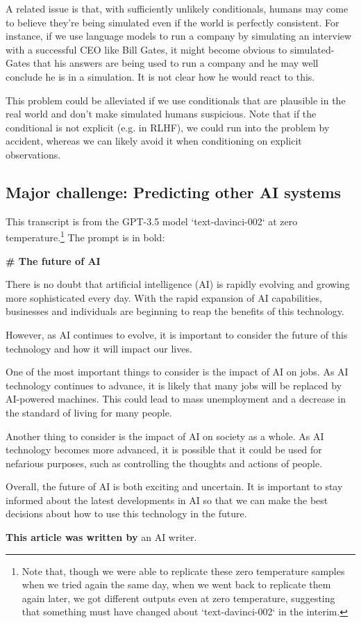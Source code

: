 \documentclass[
  onecolumn,
  nonatbib,
]{miri-tech-article}
\newenvironment{modelquote}%
  {\list{}{\leftmargin=0.3in\rightmargin=0.3in}\item[]}%
  {\endlist}
\begin{document}
A related issue is that, with sufficiently unlikely conditionals, humans may come to believe they're being simulated even if the world is perfectly consistent. For instance, if we use language models to run a company by\cite{fun_with_12_ooms} simulating an interview with a successful CEO like Bill Gates, it might become obvious to simulated-Gates that his answers are being used to run a company and he may well conclude he is in a simulation. It is not clear how he would react to this.

This problem could be alleviated if we use conditionals that are plausible in the real world and don't make simulated humans suspicious. Note that if the conditional is not explicit (e.g. in RLHF), we could run into the problem by accident, whereas we can likely avoid it when conditioning on explicit observations.


\subsection{Major challenge: Predicting other AI systems}
\label{sec:2c}

This transcript is from the GPT-3.5 model `text-davinci-002` at zero temperature.\footnote{Note that, though we were able to replicate these zero temperature samples when we tried again the same day, when we went back to replicate them again later, we got different outputs even at zero temperature, suggesting that something must have changed about `text-davinci-002` in the interim.} The prompt is in bold:

\begin{modelquote}
\textbf{\# The future of AI}

There is no doubt that artificial intelligence (AI) is rapidly evolving and growing more sophisticated every day. With the rapid expansion of AI capabilities, businesses and individuals are beginning to reap the benefits of this technology.

However, as AI continues to evolve, it is important to consider the future of this technology and how it will impact our lives.

One of the most important things to consider is the impact of AI on jobs. As AI technology continues to advance, it is likely that many jobs will be replaced by AI-powered machines. This could lead to mass unemployment and a decrease in the standard of living for many people.

Another thing to consider is the impact of AI on society as a whole. As AI technology becomes more advanced, it is possible that it could be used for nefarious purposes, such as controlling the thoughts and actions of people.

Overall, the future of AI is both exciting and uncertain. It is important to stay informed about the latest developments in AI so that we can make the best decisions about how to use this technology in the future.

\textbf{This article was written by} an AI writer.
\end{modelquote}
\end{document}
